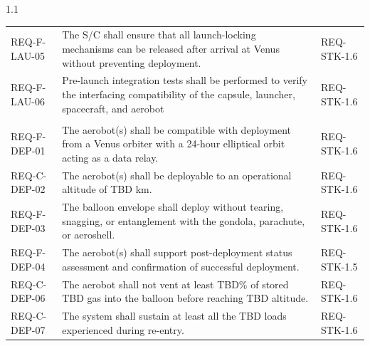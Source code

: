 {{\begin{spacing}{1.1}
\begin{longtable}{@{}
>{\raggedright\arraybackslash}p{}
>{\raggedright\arraybackslash}p{}
>{\raggedright\arraybackslash}p{}
@{}}
REQ-F-LAU-05 &
The S/C shall ensure that all launch-locking mechanisms can be released after arrival at Venus without preventing deployment. &
REQ-STK-1.6 \\
REQ-F-LAU-06 & Pre-launch integration tests shall be performed to verify the interfacing compatibility of the capsule, launcher, spacecraft, and aerobot & REQ-STK-1.6 \\

\multicolumn{3}{@{}l}{\textbf{Balloon Entry and Deployment}} \\
\midrule

REQ-F-DEP-01 &
The aerobot(s) shall be compatible with deployment from a Venus orbiter with a 24-hour elliptical orbit acting as a data relay. &
REQ-STK-1.6 \\

REQ-C-DEP-02 &
The aerobot(s) shall be deployable to an operational altitude of TBD km. & REQ-STK-1.6 \\

REQ-F-DEP-03 &
The balloon envelope shall deploy without tearing, snagging, or entanglement with the gondola, parachute, or aeroshell. & REQ-STK-1.6 \\

REQ-F-DEP-04 &
The aerobot(s) shall support post-deployment status assessment and confirmation of successful deployment. &
REQ-STK-1.5 \\


REQ-C-DEP-06 &
The aerobot shall not vent at least TBD\% of stored TBD gas into the balloon before reaching TBD altitude. &
REQ-STK-1.6 \\

REQ-C-DEP-07 &
The system shall sustain at least all the TBD loads experienced during re-entry. &
REQ-STK-1.6 \\




\end{longtable}
\end{spacing}}}

